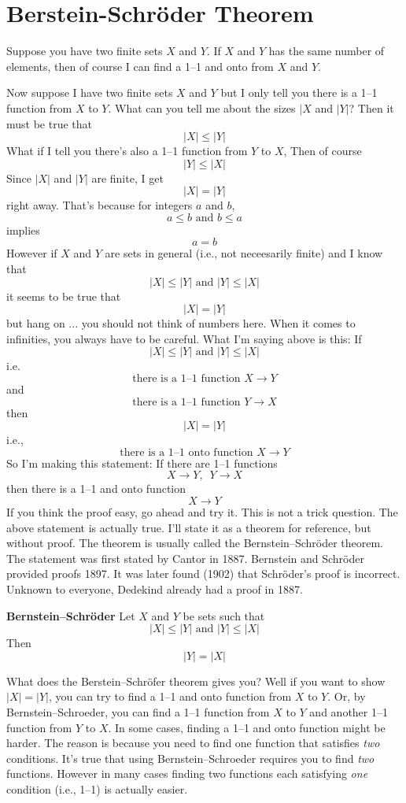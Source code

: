 \section{Berstein-Schr\"oder Theorem}

Suppose you have two finite sets $X$ and $Y$.
If $X$ and $Y$ has the same number of elements,
then of course I can find a 1--1 and onto from $X$ and $Y$.

Now suppose I have two finite sets $X$ and $Y$
but I only tell you there is a 1--1 function from $X$ to $Y$.
What can you tell me about the sizes $|X$ and $|Y|$?
Then it must be true that
\[
|X| \leq |Y|
\]
What if I tell you there's also a 1--1 function from $Y$ to $X$,
Then of course
\[
|Y| \leq |X|
\]
Since $|X|$ and $|Y|$ are finite, I get
\[
|X| = |Y|
\]
right away.
That's because for integers $a$ and $b$,
\[
a \leq b
\text{ and }
b \leq a
\]
implies
\[
a = b
\]
However if $X$ and $Y$ are sets in general (i.e., not neceesarily finite)
and I know that
\[
|X| \leq |Y|
\text{ and }
|Y| \leq |X|
\]
it seems to be true that
\[
|X| = |Y|
\]
but hang on ...
you should not think of numbers here.
When it comes to infinities, you always have to be careful.
What I'm saying above is this:
If
\[
|X| \leq |Y|
\text{ and }
|Y| \leq |X|
\]
i.e. 
\[
\text{there is a 1--1 function $X \rightarrow Y$}
\]
and
\[
\text{there is a 1--1 function $Y \rightarrow X$}
\]
then
\[
|X| = |Y|
\]
i.e.,
\[
\text{there is a 1--1 onto function $X \rightarrow Y$}
\]
So I'm making this statement:
If there are 1--1 functions
\[
X \rightarrow Y, \,\,\, Y \rightarrow X
\]
then there is a 1--1 and onto function
\[
X \rightarrow Y
\]
If you think the proof easy, go ahead and try it.
This is not a trick question.
The above statement is actually true. 
I'll state it as a theorem for reference, but without proof.
The theorem is usually called the
Bernstein--Schr\"oder theorem.
The statement was first stated by Cantor in 1887.
Bernstein and Schr\"oder provided proofs 1897.
It was later found (1902) that Schr\"oder's proof is incorrect.
Unknown to everyone, Dedekind already
had a proof in 1887.

\begin{thm}
  \textnormal{\textbf{Bernstein--Schr\"oder}}
  Let $X$ and $Y$ be sets such that
  \[
  |X| \leq |Y| \text{ and }
  |Y| \leq |X|
  \]
  Then
  \[
  |Y| = |X|
  \]
\end{thm}
  

What does the Berstein--Schr\"ofer theorem gives you?
Well if you want to show $|X| = |Y|$, you can try to find
a 1--1 and onto function from $X$ to $Y$.
Or, by Bernstein--Schroeder, you can find a 1--1 function
from $X$ to $Y$ and another 1--1 function from $Y$ to $X$.
In some cases, finding a 1--1 and onto function might be harder.
The reason is because you need to find one function that satisfies
\textit{two} conditions.
It's true that using Bernstein--Schroeder requires you
to find \textit{two} functions.
However in many cases finding
two functions each satisfying \textit{one} condition (i.e., 1--1)
is actually easier.

